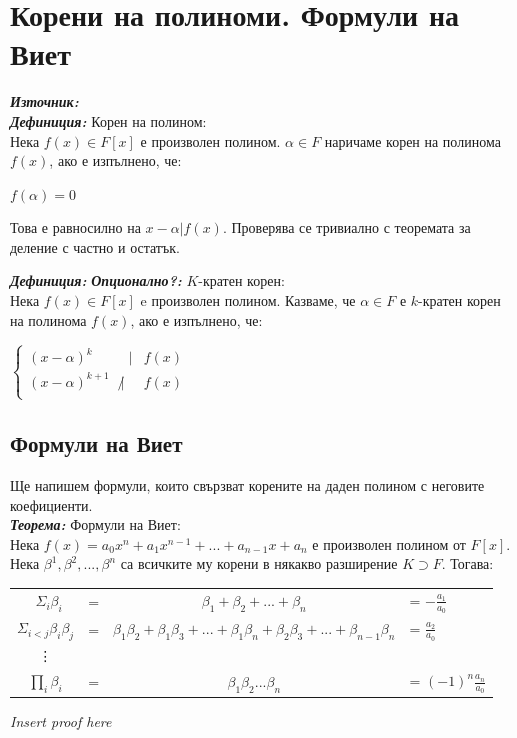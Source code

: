 \documentclass[11pt]{article} %
\newcommand{\italicBold}[1]{\textbf{\emph{#1}}}
\newcommand{\definition}{\italicBold{Дефиниция: }}
\newcommand{\theorem}{\italicBold{Теорема: }}
\newcommand{\source}{\italicBold{Източник: }}
\begin{document}
\section{Корени на полиноми. Формули на Виет}
\source {}\\

\definition Корен на полином:\\
Нека $f(x) \in F[x]$ е произволен полином. $\alpha \in F$ наричаме корен на полинома $f(x)$, ако е изпълнено, че:\\
\centerline{$f(\alpha) = 0$}
Това е равносилно на $x-\alpha|f(x)$. Проверява се тривиално с теоремата за деление с частно и остатък. \\\par

\definition \italicBold{Опционално?: }$K$-кратен корен:\\
Нека $f(x) \in F[x]$ e произволен полином. Казваме, че $\alpha \in F$ е $k$-кратен корен на полинома $f(x)$, ако е изпълнено, че:

$
   \left\{\begin{aligned}
    (x-\alpha)^{k} & \;\;|& f(x)\\
    (x-\alpha)^{k+1} & \not|& f(x)\\
   \end{aligned}\right.
$\\\par


\subsection{Формули на Виет}
Ще напишем формули, които свързват корените на даден полином с неговите коефициенти.\\

\theorem Формули на Виет:\\
Нека $f(x) = a_{0}x^{n}+a_{1}x^{n-1}+...+a_{n-1}x+a_{n}$ е произволен полином от $F[x]$.\\
Нека $\beta^{1}, \beta^{2},...,\beta^{n}$ са всичките му корени в някакво разширение $K \supset F$. Тогава:

\begin{center}\begin{tabular}{cccl}\
$\Sigma_{i}\beta_{i}$ & = & $\beta_{1}+\beta_{2}+...+\beta_{n}$ & =  $-\frac{a_{1}}{a_{0}}$ \\
$\Sigma_{i<j}\beta_{i}\beta_{j}$ & = & $\beta_{1}\beta_{2}+\beta_{1}\beta_{3}+...+\beta_{1}\beta_{n}+\beta_{2}\beta_{3}+...+\beta_{n-1}\beta_{n}$ & = $\frac{a_{2}}{a_{0}}$\\
\vdots\\
$\prod_{i}\beta_{i}$ & = & $\beta_{1}\beta_{2}...\beta_{n}$ & =
$(-1)^{n}\frac{a_{n}}{a_{0}}$ 
\end{tabular}\end{center}
\centerline{\textit{Insert proof here}}
\end{document}
